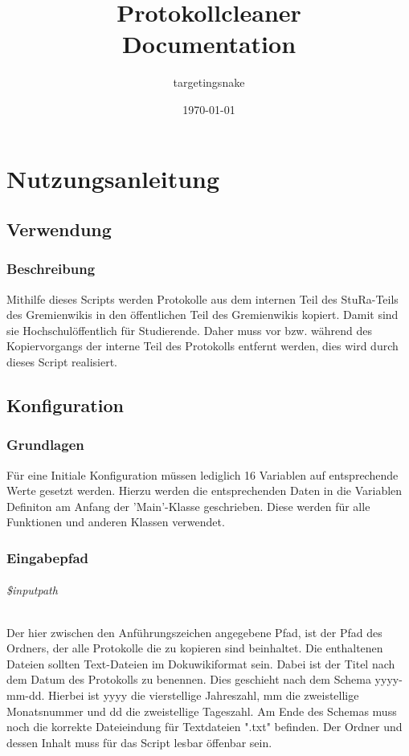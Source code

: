 \documentclass[12pt,parskip=full, pagea4]{scrreprt}
\begin{document}
	\title{Protokollcleaner \\
		\large Documentation
	}
	\date{\today}
	\author{targetingsnake}
	
	\maketitle
	
	\clearpage
	
	\tableofcontents
	
	\clearpage
	
	\part{Nutzungsanleitung}
	
	\chapter{Verwendung}
	\section{Beschreibung} Mithilfe dieses Scripts werden Protokolle aus dem internen Teil des StuRa-Teils des Gremienwikis in den öffentlichen Teil des Gremienwikis kopiert. Damit sind sie Hochschulöffentlich für Studierende. Daher muss vor bzw. während des Kopiervorgangs der interne Teil des Protokolls entfernt werden, dies wird durch dieses Script realisiert.

	\chapter{Konfiguration}
	\section{Grundlagen} Für eine Initiale Konfiguration müssen lediglich 16 Variablen auf entsprechende Werte gesetzt werden. Hierzu werden die entsprechenden Daten in die Variablen Definiton am Anfang der 'Main'-Klasse geschrieben. Diese werden für alle Funktionen und anderen Klassen verwendet.
	
	\section{Eingabepfad}
	\paragraph{\$inputpath} Der hier zwischen den Anführungszeichen angegebene Pfad, ist der Pfad des Ordners, der alle Protokolle die zu kopieren sind beinhaltet. Die enthaltenen Dateien sollten Text-Dateien im Dokuwikiformat sein. Dabei ist der Titel nach dem Datum des Protokolls zu benennen. Dies geschieht nach dem Schema yyyy-mm-dd. Hierbei ist yyyy die vierstellige Jahreszahl, mm die zweistellige Monatsnummer und dd die zweistellige Tageszahl. Am Ende des Schemas muss noch die korrekte Dateieindung für Textdateien ".txt" befinden. Der Ordner und dessen Inhalt muss für das Script lesbar öffenbar sein.
\end{document}
